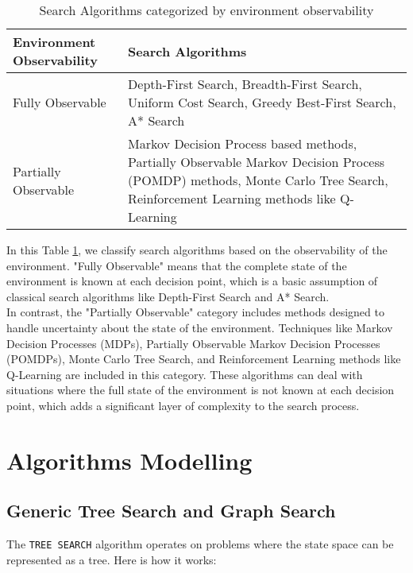 \documentclass[a4paper,UKenglish,cleveref, autoref, thm-restate]{qlinhta}
\begin{document}
    \begin{table}[h]
        \centering
        \begin{tabular}{|l|p{10cm}|}
            \hline
            \textbf{Environment Observability} & \textbf{Search Algorithms}                                                                                                                                                   \\
            \hline
            Fully Observable                   & Depth-First Search, Breadth-First Search, Uniform Cost Search, Greedy Best-First Search, A* Search                                                                           \\
            \hline
            Partially Observable               & Markov Decision Process based methods, Partially Observable Markov Decision Process (POMDP) methods, Monte Carlo Tree Search, Reinforcement Learning methods like Q-Learning \\
            \hline
        \end{tabular}
        \caption{Search Algorithms categorized by environment observability}
        \label{tab:observable_search}
    \end{table}

    In this Table \ref{tab:observable_search}, we classify search algorithms based on the observability of the environment. "Fully Observable" means that the complete state of the environment is known at each decision point, which is a basic assumption of classical search algorithms like Depth-First Search and A* Search.\\

    In contrast, the "Partially Observable" category includes methods designed to handle uncertainty about the state of the environment. Techniques like Markov Decision Processes (MDPs), Partially Observable Markov Decision Processes (POMDPs), Monte Carlo Tree Search, and Reinforcement Learning methods like Q-Learning are included in this category. These algorithms can deal with situations where the full state of the environment is not known at each decision point, which adds a significant layer of complexity to the search process.\\


    \section{Algorithms Modelling}

    \subsection{Generic Tree Search and Graph Search}
    The \texttt{TREE SEARCH} algorithm operates on problems where the state space can be represented as a tree. Here is how it works:
\end{document}
